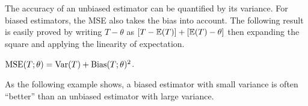 The accuracy of an unbiased estimator can be quantified by its variance. For biased estimators, the MSE also takes the bias into account. The following result is easily proved by writing $T-\theta$ as $[T-\mathbb{E}(T)]+[\mathbb{E}(T)-\theta]$ then expanding the square and applying the linearity of expectation.
\begin{theorem}
$\text{MSE}(T;\theta) = \text{Var}(T) + \text{Bias}(T;\theta)^2$.
\end{theorem}
As the following example shows, a biased estimator with small variance is often ``better'' than an unbiased estimator with large variance.

